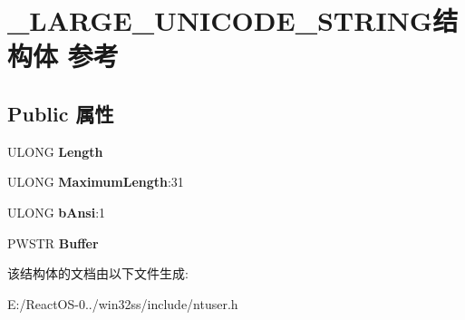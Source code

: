 \hypertarget{struct___l_a_r_g_e___u_n_i_c_o_d_e___s_t_r_i_n_g}{}\section{\+\_\+\+L\+A\+R\+G\+E\+\_\+\+U\+N\+I\+C\+O\+D\+E\+\_\+\+S\+T\+R\+I\+N\+G结构体 参考}
\label{struct___l_a_r_g_e___u_n_i_c_o_d_e___s_t_r_i_n_g}
\subsection*{Public 属性}
\begin{DoxyCompactItemize}
\item 
\mbox{\label{struct___l_a_r_g_e___u_n_i_c_o_d_e___s_t_r_i_n_g_aaaca148291217886c7d19dab9d2cc211}} 
U\+L\+O\+NG {\bfseries Length}
\item 
\mbox{\label{struct___l_a_r_g_e___u_n_i_c_o_d_e___s_t_r_i_n_g_a1c204a90abf8d44b2668ccca672b5358}} 
U\+L\+O\+NG {\bfseries Maximum\+Length}\+:31
\item 
\mbox{\label{struct___l_a_r_g_e___u_n_i_c_o_d_e___s_t_r_i_n_g_acb0613d2aecdff7933362eff6d05273a}} 
U\+L\+O\+NG {\bfseries b\+Ansi}\+:1
\item 
\mbox{\label{struct___l_a_r_g_e___u_n_i_c_o_d_e___s_t_r_i_n_g_a115736737c8b7902e1e9464d5e4b1c72}} 
P\+W\+S\+TR {\bfseries Buffer}
\end{DoxyCompactItemize}


该结构体的文档由以下文件生成\+:\begin{DoxyCompactItemize}
\item 
E\+:/\+React\+O\+S-\/0../win32ss/include/ntuser.\+h\end{DoxyCompactItemize}
